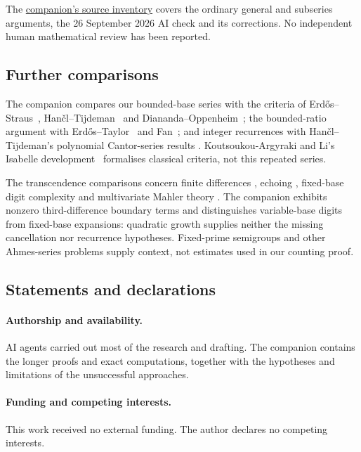 \documentclass[11pt]{article}
\newcommand{\longrecord}[2]{\href{erdos269-running-lcm-reasoning-surface.pdf\##1}{#2}}
\begin{document}
The \longrecord{r3-source-inventory}{companion's source inventory} covers
the ordinary general and subseries arguments, the 26 September 2026 AI
check and its corrections. No independent human mathematical review has
been reported.

\subsection*{Further comparisons}

The companion compares our bounded-base series with the criteria of
Erd\H{o}s--Straus~\cite{erdosstraus1974},
Han\v{c}l--Tijdeman~\cite{hancltijdeman2004} and
Diananda--Oppenheim~\cite{dianandaoppenheim1955}; the bounded-ratio argument
with Erd\H{o}s--Taylor~\cite[Theorem~1, p.~600]{erdostaylor1957} and
Fan~\cite[Lemma~3.1, p.~7]{fan2026strongly}; and integer recurrences with
Han\v{c}l--Tijdeman's polynomial Cantor-series results
\cite[Theorems~2.2, 3.1 and 4.2]{hancltijdeman2008}.
Koutsoukou-Argyraki and Li's Isabelle development~\cite{afperdosstraus2020}
formalises classical criteria, not this repeated series.

The transcendence comparisons concern finite differences
\cite{lucaouaknineworrell2025}, echoing \cite{kebis2024echoing}, fixed-base
digit complexity \cite{adamczewskibugeaud2007} and multivariate Mahler theory
\cite{adamczewskifaverjon2026}. The companion exhibits nonzero
third-difference boundary terms and distinguishes variable-base digits
from fixed-base expansions: quadratic growth supplies neither the missing
cancellation nor recurrence hypotheses. Fixed-prime semigroups
\cite{tijdemanmeijer1974,languasco2025} and other Ahmes-series problems
\cite{kovactao2024} supply context, not estimates used in our counting proof.

\subsection*{Statements and declarations}
\paragraph{Authorship and availability.}
AI agents carried out most of the research and drafting. The companion
contains the longer proofs and exact computations, together with the
hypotheses and limitations of the unsuccessful approaches.
\paragraph{Funding and competing interests.}
This work received no external funding. The author declares no competing
interests.
\end{document}
